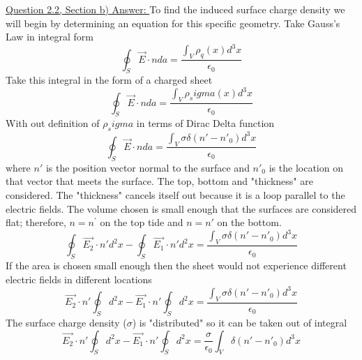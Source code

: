\documentclass[12pt]{article}
\begin{document}
    \underline{Question 2.2, Section b) Answer: }
    \newline To find the induced surface charge density we will begin by determining an equation for this specific geometry.
    \newline Take Gauss's Law in integral form
    \begin{equation} \label{eq: 1.2.1}
        \oint_S \vec{E} \cdot n da = \frac{\int_V \rho_q(x) d^3 x}{\epsilon_0}
    \end{equation}
    Take this integral in the form of a charged sheet
    \begin{equation} \label{eq: 1.2.2}
        \oint_S \vec{E} \cdot n da = \frac{\int_V \rho_sigma(x) d^3 x}{\epsilon_0}
    \end{equation}
    With out definition of $\rho_sigma$ in terms of Dirac Delta function
    \begin{equation} \label{eq: 1.2.3}
        \oint_S \vec{E} \cdot n da = \frac{\int_V \sigma \delta (n'-n'_0) d^3 x}{\epsilon_0}
    \end{equation}
    where $n'$ is the position vector normal to the surface and $n'_0$ is the location on that vector that meets the surface. 
    \newline The top, bottom and "thickness" are considered. The "thickness" cancels itself out because it is a loop parallel to the electric fields. The volume chosen is small enough that the surfaces are considered flat; therefore, $n=n^{'}$ on the top tide and $n=n'$ on the bottom. 
    \begin{equation} \label{eq: 1.2.4}
        \oint_S \vec{E_2} \cdot n' d^2 x - \oint_S \vec{E_1} \cdot n' d^2x= \frac{\int_V \sigma \delta (n'-n'_0) d^3 x}{\epsilon_0}
    \end{equation}
    \newline If the area is chosen small enough then the sheet would not experience different electric fields in different locations
    \begin{equation} \label{eq: 1.2.5}
        \vec{E_2} \cdot n' \oint_S d^2x - \vec{E_1} \cdot n' \oint_S d^2x = \frac{\int_V \sigma \delta (n'-n'_0) d^3 x}{\epsilon_0}
    \end{equation}
    The surface charge density ($\sigma$) is "distributed" so it can be taken out of integral
    \begin{equation} \label{eq: 1.2.6}
        \vec{E_2} \cdot n' \oint_S d^2x - \vec{E_1} \cdot n' \oint_S d^2x = \frac{\sigma}{\epsilon_0} \int_V \delta (n'-n'_0) d^3x
    \end{equation}
\end{document}
